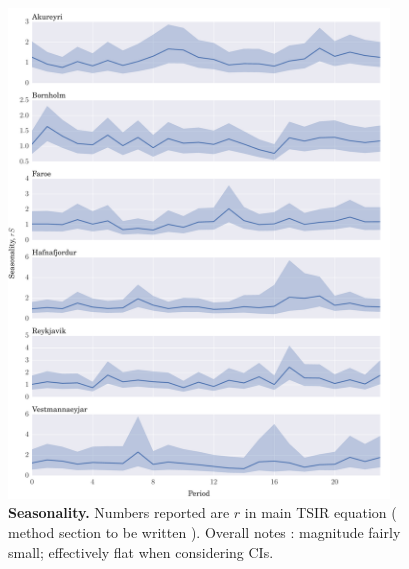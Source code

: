 \documentclass[10pt]{article}
\begin{document}
\begin{figure}[H]
\label{fig_seasonality}
\caption{\textbf{Seasonality.} Numbers reported are $r$ in main TSIR equation ( method section to be written ). Overall notes : magnitude fairly small; effectively flat when considering CIs.}
\centering
\includegraphics[width=0.9\textwidth]{figures/1_seasonality.pdf}
\end{figure}
\end{document}

